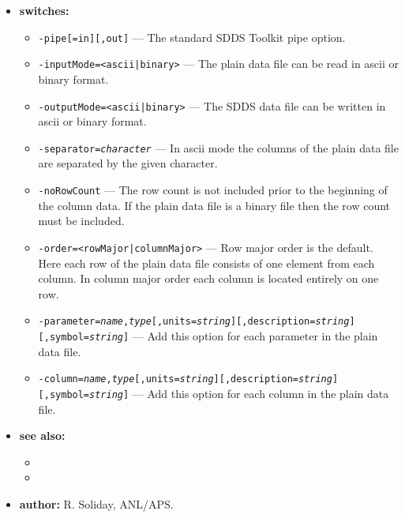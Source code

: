 \begin{itemize}
\item {\bf switches:}
    \begin{itemize}
    \item {\tt -pipe[=in][,out]} --- The standard SDDS Toolkit pipe option.
    \item {\tt -inputMode=<ascii|binary>} --- The plain data file can be read in ascii or binary format.
    \item {\tt -outputMode=<ascii|binary>} --- The SDDS data file can be written in ascii or binary format.
    \item {\tt -separator={\em character}} --- In ascii mode the columns of the plain data file are separated 
	by the given character.
    \item {\tt -noRowCount} --- The row count is not included prior to the beginning of the column data. 
	If the plain data file is a binary file then the row count must be included.
    \item {\tt -order=<rowMajor|columnMajor>} --- Row major order is the default. Here each row of the 
	plain data file consists of one element from each column. In column major order each column 
	is located entirely on one row.
    \item {\tt -parameter={\em name},{\em type}[,units={\em string}][,description={\em string}][,symbol={\em string}]} --- 
	Add this option for each parameter in the plain data file.
    \item {\tt -column={\em name},{\em type}[,units={\em string}][,description={\em string}][,symbol={\em string}]} --- 
	Add this option for each column in the plain data file.
    \end{itemize}
\item {\bf see also:}
    \begin{itemize}
    \item {}
    \item {}
    \end{itemize}
\item {\bf author:} R. Soliday, ANL/APS.
\end{itemize}

